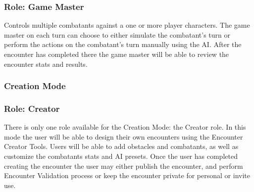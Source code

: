 \documentclass[12pt,a4paper]{report}
\begin{document}
	\subsubsection{Role: Game Master}
	Controls multiple combatants against a one or more player characters. The game master on each turn can choose to either simulate the combatant's turn or perform the actions on the combatant's turn manually using the AI. After the encounter has completed there the game master will be able to review the encounter stats and results.
	
	\subsubsection{Creation Mode}
	\subsubsection{Role: Creator}
	There is only one role available for the Creation Mode: the Creator role. In this mode the user will be able to design their own encounters using the Encounter Creator Tools. Users will be able to add obstacles and combatants, as well as customize the combatants stats and AI presets. Once the user has completed creating the encounter the user may either publish the encounter, and perform Encounter Validation process or keep the encounter private for personal or invite use.
	\newpage 
	
	\newpage
\end{document}
